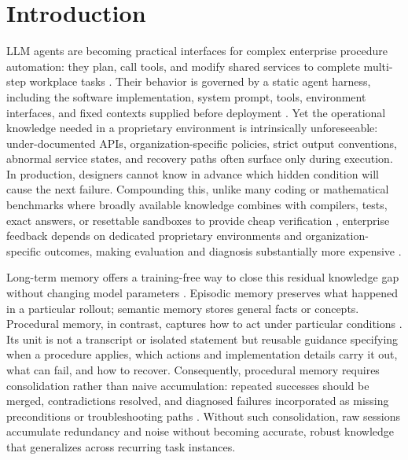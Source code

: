 \section{Introduction}
\label{sec:introduction}

LLM agents are becoming practical interfaces for complex enterprise procedure
automation: they plan, call tools, and modify shared services to complete
multi-step workplace tasks \citep{theagentcompany,selfevolving}. Their behavior
is governed by a static agent harness, including the software implementation,
system prompt, tools, environment interfaces, and fixed contexts supplied
before deployment \citep{coala}. Yet the operational knowledge needed in a
proprietary environment is intrinsically unforeseeable: under-documented APIs,
organization-specific policies, strict output conventions, abnormal service
states, and recovery paths often surface only during execution. In production,
designers cannot know in advance which hidden condition will cause the next
failure. Compounding this, unlike many coding or mathematical benchmarks where
broadly available knowledge combines with compilers, tests, exact answers, or
resettable sandboxes to provide cheap verification
\citep{swebench,mathdataset}, enterprise feedback depends on dedicated
proprietary environments and organization-specific outcomes, making evaluation
and diagnosis substantially more expensive \citep{theagentcompany}.

Long-term memory offers a training-free way to close this residual knowledge
gap without changing model parameters \citep{coala,memsurvey}. Episodic memory
preserves what happened in a particular rollout; semantic memory stores general
facts or concepts. Procedural memory, in contrast, captures how to act under
particular conditions
\citep{tulving1972,cohen1980,squire1992,anderson1993}. Its unit is not a
transcript or isolated statement but reusable guidance specifying when a
procedure applies, which actions and implementation details carry it out, what
can fail, and how to recover. Consequently, procedural memory requires
consolidation rather than naive accumulation: repeated successes should be
merged, contradictions resolved, and diagnosed failures incorporated as
missing preconditions or troubleshooting paths
\citep{automanual,awm,memp}. Without such consolidation, raw sessions accumulate
redundancy and noise without becoming accurate, robust knowledge that
generalizes across recurring task instances.



